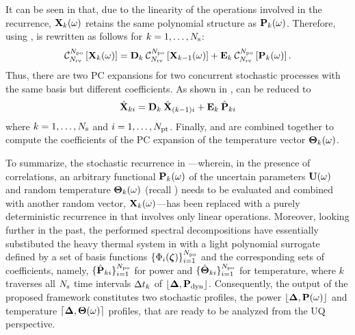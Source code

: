 It can be seen in  that, due to the linearity of the operations involved in the recurrence, $\mathbf{X}_k(\omega)$ retains the same polynomial structure as $\mathbf{P}_k(\omega)$. Therefore, using ,  is rewritten as follows for $k = 1, \dotsc, N_\text{s}$:
\begin{equation} \elabel{expanded-recurrence}
  \oPC{\vars}{\pcorder}{\vX_k(\o)} = \mCF_k \: \oPC{\vars}{\pcorder}{\vX_{k-1}(\o)} + \mCS_k \: \oPC{\vars}{\pcorder}{\vP_k(\o)}.
\end{equation}
Thus, there are two PC expansions for two concurrent stochastic processes with the same basis but different coefficients. As shown in ,  can be reduced to
\begin{equation} \elabel{pc-recurrence}
  \pcc{\vX}_{ki} = \mCF_k \: \pcc{\vX}_{(k - 1)i} + \mCS_k \: \pcc{\vP}_{ki}
\end{equation}
where $k = 1, \dotsc, N_\text{s}$ and $i = 1, \dotsc, {N_\text{pt}}$. Finally,  and  are combined together to compute the coefficients of the PC expansion of the temperature vector ${\boldsymbol\Theta}_k(\omega)$.

To summarize, the stochastic recurrence in ---wherein, in the presence of correlations, an arbitrary functional $\mathbf{P}_k(\omega)$ of the uncertain parameters $\mathbf{U}(\omega)$ and random temperature ${\boldsymbol\Theta}_k(\omega)$ (recall ) needs to be evaluated and combined with another random vector, $\mathbf{X}_k(\omega)$---has been replaced with a purely deterministic recurrence in  that involves only linear operations. Moreover, looking further in the past, the performed spectral decompositions have essentially substibuted the heavy thermal system in  with a light polynomial surrogate defined by a set of basis functions $\{ \Phi_i(\boldsymbol{\zeta}) \}_{i = 1}^{{N_\text{po}}}$ and the corresponding sets of coefficients, namely, $\{ \hat{\mathbf{P}}_{ki} \}_{i = 1}^{{N_\text{po}}}$ for power and $\{ \hat{{\boldsymbol\Theta}}_{ki} \}_{i = 1}^{{N_\text{po}}}$ for temperature, where $k$ traverses all $N_\text{s}$ time intervals $\Delta t_k$ of $\profPdyn$. Consequently, the output of the proposed framework constitutes two stochastic profiles, the power $\profP{\o}$ and temperature $\profT{\o}$ profiles, that are ready to be analyzed from the UQ perspective.
